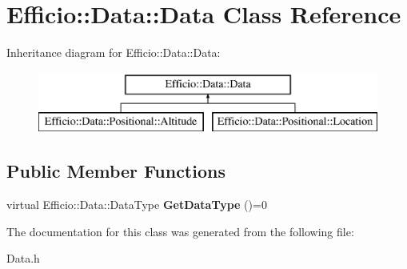 \hypertarget{class_efficio_1_1_data_1_1_data}{}\section{Efficio\+:\+:Data\+:\+:Data Class Reference}
\label{class_efficio_1_1_data_1_1_data}
Inheritance diagram for Efficio\+:\+:Data\+:\+:Data\+:\begin{figure}[H]
\begin{center}
\leavevmode
\includegraphics[height=2.000000cm]{class_efficio_1_1_data_1_1_data}
\end{center}
\end{figure}
\subsection*{Public Member Functions}
\begin{DoxyCompactItemize}
\item 
virtual Efficio\+::\+Data\+::\+Data\+Type {\bfseries Get\+Data\+Type} ()=0\hypertarget{class_efficio_1_1_data_1_1_data_a6498572631059831977e205d4b613f8a}{}\label{class_efficio_1_1_data_1_1_data_a6498572631059831977e205d4b613f8a}

\end{DoxyCompactItemize}


The documentation for this class was generated from the following file\+:\begin{DoxyCompactItemize}
\item 
Data.\+h\end{DoxyCompactItemize}
